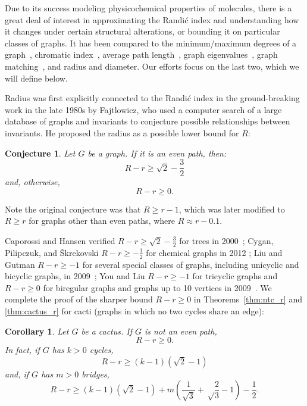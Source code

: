\documentclass{amsart}
\newtheorem{cor}[thm]{Corollary}
\newtheorem{conj}[thm]{Conjecture}
\theoremstyle{definition}
\begin{document}
Due to its success modeling physicochemical properties of molecules, there is a great deal of interest in approximating the Randi\'c index and understanding how it changes under certain structural alterations, or bounding it on particular classes of graphs. It has been compared to the minimum/maximum degrees of a graph~\cite{bollobas1998extremal, suil2018sharp, divnic2013proof, liu2013conjecture}, chromatic index~\cite{li2010relation}, average path length~\cite{caporossi2000variable}, graph eigenvalues~\cite{araujo1998connectivity, aouchiche2006variable, elphick2015bounds}, graph matching~\cite{aouchiche2006variable}, and radius and diameter. Our efforts focus on the last two, which we will define below.

Radius was first explicitly connected to the Randi\'c index in the ground-breaking work in the late 1980s by Fajtlowicz, who used a computer search of a large database of graphs and invariants to conjecture possible relationships between invariants. He proposed the radius as a possible lower bound for $R$: 
\begin{conj}\cite{fajtlowicz1988graffiti}\label{conj:r}
Let $G$ be a graph. If it is an even path, then:
\[R -r \geq \sqrt 2 - \frac{3}{2}\]
and, otherwise,
\[R -r \geq 0.\]
\end{conj}
\noindent Note the original conjecture was that $R \geq r-1$, which was later modified to $R \geq r$ for graphs other than even paths, where $R \approx r-0.1$.

Caporossi and Hansen verified $R-r \geq \sqrt 2 - \frac{3}{2}$ for trees in 2000~\cite{caporossi2000variable}; Cygan, Pilipczuk, and \v{S}krekovski $R-r \geq -\frac{1}{2}$ for chemical graphs in 2012 \cite{cygan2012inequality}; Liu and Gutman $R-r \geq -1$ for several special classes of graphs, including unicyclic and bicyclic graphs, in 2009~\cite{liu2009conjecture}; You and Liu $R-r \geq -1$ for tricyclic graphs and $R-r \geq 0$ for biregular graphs and graphs up to 10 vertices in 2009~\cite{you2009conjecture}. We complete the proof of the sharper bound $R-r \geq 0$ in Theorems~\ref{thm:ntc_r} and \ref{thm:cactus_r} for cacti (graphs in which no two cycles share an edge):
\begin{cor}\label{cor:r}
Let $G$ be a cactus. If $G$ is not an even path,
\[R-r \geq 0.\]
In fact, if $G$ has $k>0$ cycles,
\[R-r \geq (k-1)\left(\sqrt 2 - 1\right)\]
and, if $G$ has $m>0$ bridges,
\[R-r \geq (k-1)\left(\sqrt2-1\right)+m\left(\frac{1}{\sqrt 3} + \sqrt\frac{2}{3}-1\right) - \frac{1}{2}.\]
\end{cor}
\end{document}
